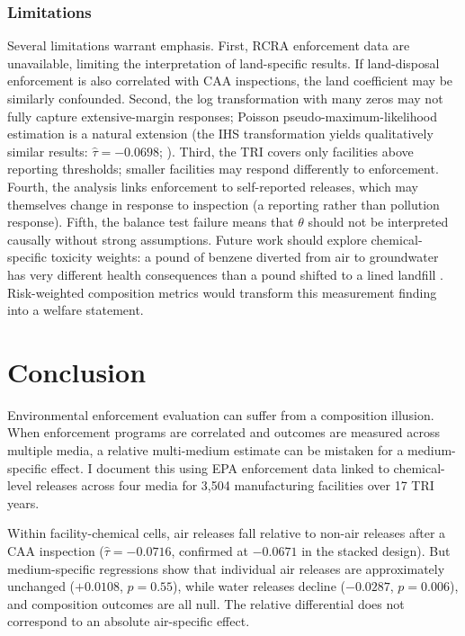 \documentclass[12pt]{article}
\begin{document}
\subsubsection*{Limitations} Several limitations warrant emphasis. First, RCRA enforcement data are unavailable, limiting the interpretation of land-specific results. If land-disposal enforcement is also correlated with CAA inspections, the land coefficient may be similarly confounded. Second, the log transformation with many zeros may not fully capture extensive-margin responses; Poisson pseudo-maximum-likelihood estimation \citep{santosilva2006, chenroth2023} is a natural extension (the IHS transformation yields qualitatively similar results: $\hat{\tau} = -0.0698$; ). Third, the TRI covers only facilities above reporting thresholds; smaller facilities may respond differently to enforcement. Fourth, the analysis links enforcement to self-reported releases, which may themselves change in response to inspection (a reporting rather than pollution response). Fifth, the balance test failure means that $\theta$ should not be interpreted causally without strong assumptions. Future work should explore chemical-specific toxicity weights: a pound of benzene diverted from air to groundwater has very different health consequences than a pound shifted to a lined landfill \citep{currie2020air}. Risk-weighted composition metrics would transform this measurement finding into a welfare statement.


\section{Conclusion}
\label{sec:conclusion}

Environmental enforcement evaluation can suffer from a composition illusion. When enforcement programs are correlated and outcomes are measured across multiple media, a relative multi-medium estimate can be mistaken for a medium-specific effect. I document this using EPA enforcement data linked to chemical-level releases across four media for 3,504 manufacturing facilities over 17 TRI years.

Within facility-chemical cells, air releases fall relative to non-air releases after a CAA inspection ($\hat{\tau} = -0.0716$, confirmed at $-0.0671$ in the stacked design). But medium-specific regressions show that individual air releases are approximately unchanged ($+0.0108$, $p = 0.55$), while water releases decline ($-0.0287$, $p = 0.006$), and composition outcomes are all null. The relative differential does not correspond to an absolute air-specific effect.
\end{document}
